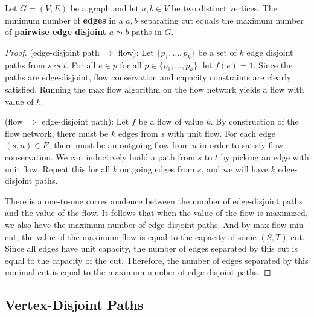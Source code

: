 \begin{theorem}
    Let $G=(V,E)$ be a graph and let $a,b \in V$ be two distinct vertices. The minimum number of \textbf{edges} in a $a,b$ separating cut equals the maximum number of \textbf{pairwise edge disjoint} $a \leadsto b$ paths in $G$.
\end{theorem}

\begin{proof}
    \hfill

    (edge-disjoint path $\Rightarrow$ flow): Let $\{p_1,\ldots,p_k\}$ be a set of $k$ edge disjoint paths from $s \leadsto t$. For all $e \in p$ for all $p \in \{p_1,\ldots,p_k\}$, let $f(e) = 1$. Since the paths are edge-disjoint, flow conservation and capacity constraints are clearly satisfied. Running the max flow algorithm on the flow network yields a flow with value of $k$.

    (flow $\Rightarrow$ edge-disjoint path): Let $f$ be a flow of value $k$. By construction of the flow network, there must be $k$ edges from $s$ with unit flow. For each edge $(s,u) \in E$, there must be an outgoing flow from $u$ in order to satisfy flow conservation. We can inductively build a path from $s$ to $t$ by picking an edge with unit flow. Repeat this for all $k$ outgoing edges from $s$, and we will have $k$ edge-disjoint paths.

    There is a one-to-one correspondence between the number of edge-disjoint paths and the value of the flow. It follows that when the value of the flow is maximized, we also have the maximum number of edge-disjoint paths. And by max flow-min cut, the value of the maximum flow is equal to the capacity of some $(S,T)$ cut. Since all edges have unit capacity, the number of edges separated by this cut is equal to the capacity of the cut. Therefore, the number of edges separated by this minimal cut is equal to the maximum number of edge-disjoint paths.
\end{proof}

\subsection{Vertex-Disjoint Paths}

